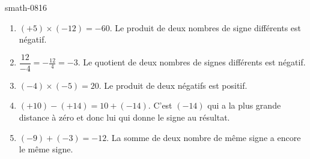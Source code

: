 
\begin{corrige}{smath-0816}

    \begin{enumerate}
        \item
            \( (+5)\times (-12)=-60\). Le produit de deux nombres de signe différents est négatif.
        \item
            \( \dfrac{ 12 }{ -4 }=-\frac{ 12 }{ 4 }=-3\). Le quotient de deux nombres de signes différents est négatif.
        \item
            \( (-4)\times (-5)=20\). Le produit de deux négatifs est positif.
        \item
            \( (+10)-(+14)=10+(-14)\). C'est \( (-14)\) qui a la plus grande distance à zéro et donc lui qui donne le signe au résultat.
        \item
            \( (-9)+(-3)=-12\). La somme de deux nombre de même signe a encore le même signe.
    \end{enumerate}

\end{corrige}
